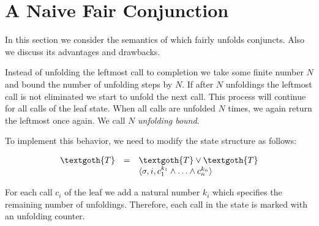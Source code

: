 \section{A Naive Fair Conjunction}
\label{sec:naive}

In this section we consider the semantics of \mk which fairly unfolds conjuncts. Also we discuss its advantages and drawbacks.

Instead of unfolding the leftmost call to completion we take some finite number $N$ and bound the number of unfolding steps by $N$. If after $N$ unfoldings the leftmost
call is not eliminated we start to unfold the next call. This process will continue for all calls of the leaf state. When all calls are unfolded $N$ times, we again return the leftmost once
again. We call $N$ \emph{unfolding bound}.


To implement this behavior, we need to modify the state structure as follows:

\[
\begin{array}{rcl}
  \textgoth{T} &=& \textgoth{T} \lor \textgoth{T} \\
               & &\inbr{\sigma, i, c_1^{k_1} \land \ldots \land c_n^{k_n}} 
\end{array}
\]

For each call $c_i$ of the leaf we add a natural number $k_i$ which specifies the remaining number of unfoldings. Therefore, each call in the state is marked with an unfolding counter. 


